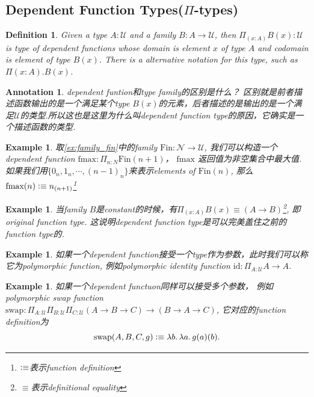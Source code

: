 \documentclass{article}
\newtheorem{example}[theorem]{Example}
\newtheorem{definition}[theorem]{Definition}
\newtheorem{annotation}[theorem]{Annotation}
\newcommand{\lam}[2]{\ensuremath{\lambda #1\ldotp #2}} %
\newcommand{\defeqv}{\vcentcolon\equiv}
\begin{document}
\subsection{Dependent Function Types(\texorpdfstring{$\Pi$}{pi}-types)}


\begin{definition}
\rm Given a type $A:\mathcal{U}$ and a family $B:A \to \mathcal{U}$, then $\Pi_{(x:A)} B(x):\mathcal{U}$ is type of dependent functions whose domain is element $x$ of type $A$ and  codomain is element of type $B(x)$. There is a alternative notation for this type, such as $\Pi(x : A).B(x)$.
\end{definition}

\begin{annotation}
\rm dependent funtion和type family的区别是什么？ 区别就是前者描述函数输出的是一个满足某个type $B(x)$的元素，后者描述的是输出的是一个满足$\mathcal{U}$的类型.所以这也是这里为什么叫dependent function type的原因，它确实是一个描述函数的类型.
\end{annotation}


\begin{example}
\rm 取\ref{ex:family_fin}中的family $\text{Fin}:\mathcal{N} \to \mathcal{U}$, 我们可以构造一个dependent function $\text{fmax}:\Pi_{n : N} \text{Fin}(n+1)$， $\text{fmax}$
返回值为非空集合中最大值. 如果我们用$\{0_{n}, 1_{n}, \cdots, (n-1)_n\}$来表示elements of $\text{Fin}(n)$, 那么$\text{fmax}(n) \defeqv n_{(n+1)}$\footnote{$\defeqv$表示function definition} 
\end{example}

\begin{example}
\rm 当family $B$是constant的时候，有$\Pi_{(x:A)} B(x) \equiv (A \to B)$\footnote{$\equiv$表示definitional equality}, 即original function type. 这说明dependent function type是可以完美盖住之前的function type的.
\end{example}

\begin{example}
\rm 如果一个dependent function接受一个type作为参数，此时我们可以称它为polymorphic function, 例如polymorphic identity function $\text{id}:\Pi_{A:\mathcal{U}} A \to A$.
\end{example}

\begin{example}
\rm 如果一个dependent functuon同样可以接受多个参数， 例如polymorphic swap function $\text{swap}: \Pi_{A:\mathcal{U}}\Pi_{B:\mathcal{U}}\Pi_{C:\mathcal{U}}(A \to B \to C) \to (B \to A \to C)$, 它对应的function definition为
\[
	\text{swap}(A,B,C,g) \defeqv \lam{b}{\lam{a}{g(a)(b)}}.
\]
\end{example}
\end{document}
